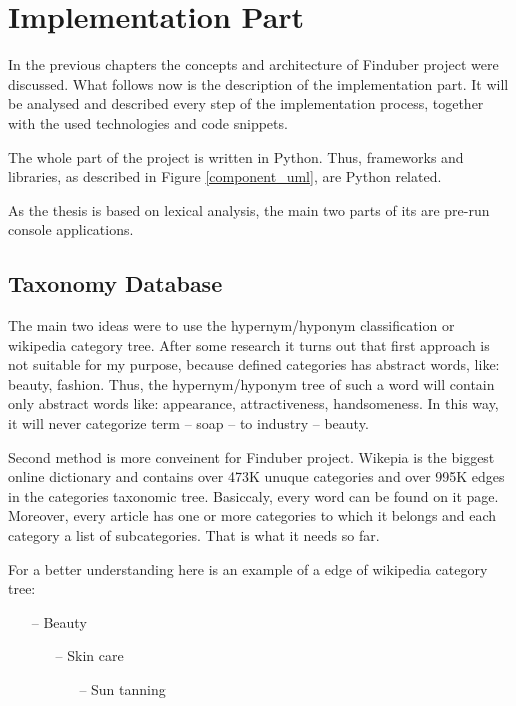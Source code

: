 \section{Implementation Part}
In the previous chapters the concepts and architecture of Finduber project were discussed. What follows now is the description of the implementation part. It will be analysed and described every step of the implementation process, together with the used technologies and code snippets. 

The whole part of the project is written in Python. Thus, frameworks and libraries, as described in Figure \ref{component_uml}, are Python related.

As the thesis is based on lexical analysis, the main two parts of its are pre-run console applications.

\subsection{Taxonomy Database}

The main two ideas were to use the hypernym/hyponym classification or wikipedia category tree. After some research it turns out that first approach is not suitable for my purpose, because defined categories has abstract words, like: beauty, fashion. Thus, the hypernym/hyponym tree of such a word will contain only abstract words like: appearance, attractiveness, handsomeness. In this way, it will never categorize term -- soap -- to industry -- beauty. 

Second method is more conveinent for Finduber project. Wikepia is the biggest online dictionary and contains over 473K unuque categories and over 995K edges in the categories taxonomic tree. Basiccaly, every word can be found on it page. Moreover, every article has one or more categories to which it belongs and each category a list of subcategories. That is what it needs so far. 

For a better understanding here is an example of a edge of wikipedia category tree:

\begin{enumerate}
\item[--] Beauty
\begin{enumerate}
\item[--] Skin care
\begin{enumerate}
\item[--] Sun tanning
\end{enumerate}
\end{enumerate}
\end{enumerate}

